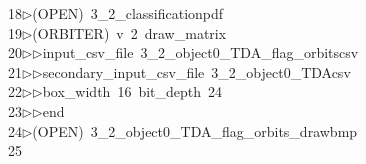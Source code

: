 \begin{tabbing}
18\>$\triangleright$\>(OPEN)\ 3\_2\_classificationpdf\\[0pt]
19\>$\triangleright$\>(ORBITER)\ v\ 2\ draw\_matrix\ \\[0pt]
20\>$\triangleright$\>$\triangleright$\>input\_csv\_file\ 3\_2\_object0\_TDA\_flag\_orbitscsv\ \\[0pt]
21\>$\triangleright$\>$\triangleright$\>secondary\_input\_csv\_file\ 3\_2\_object0\_TDAcsv\ \\[0pt]
22\>$\triangleright$\>$\triangleright$\>box\_width\ 16\ bit\_depth\ 24\ \\[0pt]
23\>$\triangleright$\>$\triangleright$\>end\\[0pt]
24\>$\triangleright$\>(OPEN)\ 3\_2\_object0\_TDA\_flag\_orbits\_drawbmp\\[0pt]
25\>\end{tabbing}
